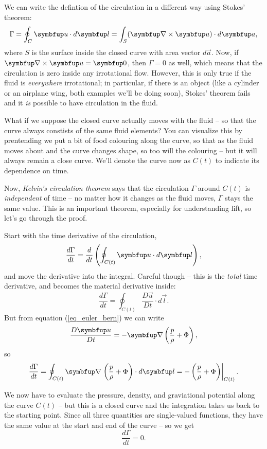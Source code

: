 We can write the defintion of the circulation in a different way using Stokes' theorem:
\begin{equation}
\label{eq_circ_curl}
\Gamma = \oint_C \vec{u} \cdot d\vec{l} = \int_S (\grad \times \vec{u} ) \cdot d\vec{a},
\end{equation}
where $S$ is the surface inside the closed curve with area vector $d\vec{a}$.  Now, if $\grad \times \vec{u} = \vec{0}$, then $\Gamma = 0$ as well, which means that the circulation is zero inside any irrotational flow.  However, this is only true if the fluid is \emph{everywhere} irrotational; in particular, if there is an object (like a cylinder or an airplane wing, both examples we'll be doing soon), Stokes' theorem fails and it \emph{is} possible to have circulation in the fluid.

What if we suppose the closed curve actually moves with the fluid -- so that the curve always constists of the same fluid elements?  You can visualize this by prentending we put a bit of food colouring along the curve, so that as the fluid moves about and the curve changes shape, so too will the colouring -- but it will always remain a close curve.  We'll denote the curve now as $C(t)$ to indicate its dependence on time.  

Now, \emph{Kelvin's circulation theorem} says that the circulation $\Gamma$ around $C(t)$ is \emph{independent} of time -- no matter how it changes as the fluid moves, $\Gamma$ stays the same value.  This is an important theorem, especially for understanding lift, so let's go through the proof.

Start with the time derivative of the circulation,
\[
\frac{d\Gamma}{dt} = \frac{d}{dt} \left( \oint_{C(t)} \uu \cdot d\vec{l} \right),
\]
and move the derivative into the integral.  Careful though -- this is the \emph{total} time derivative, and becomes the material derivative inside:
\[
\frac{d\Gamma}{dt} = \oint_{C(t)} \frac{D\vec{u}}{Dt} \cdot d\vec{l}.
\]
But from equation (\ref{eq_euler_bern}) we can write 
\[
\frac{D\vec{u}}{Dt} = -\grad \left(\frac{p}{\rho} + \Phi \right),
\]
so
 \[
\frac{d\Gamma}{dt} = \oint_{C(t)} \grad \left.  \left(\frac{p}{\rho} + \Phi \right) \cdot d\vec{l} = - \left(\frac{p}{\rho} + \Phi \right) \right|_{C(t)}.
\]

We now have to evaluate the pressure, density, and graviational potential along the curve $C(t)$ -- but this is a closed curve and the integration takes us back to the starting point.  Since all three quantities are single-valued functions, they have the same value at the start and end of the curve -- so we get 
\begin{equation}
\frac{d\Gamma}{dt} = 0.
\end{equation}

